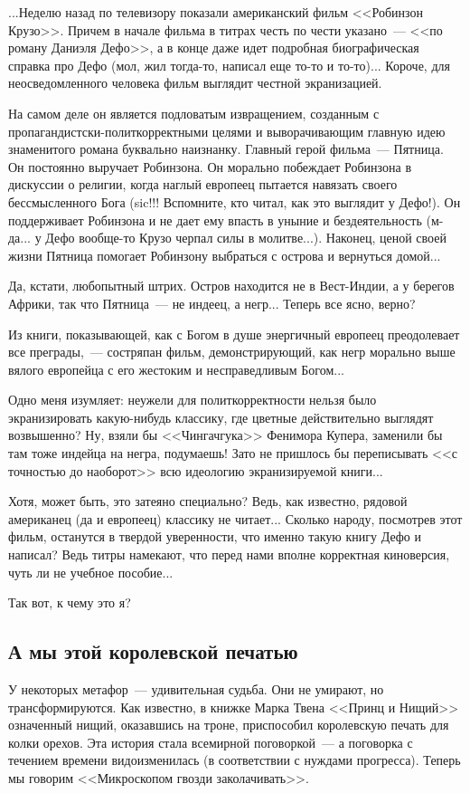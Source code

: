\documentclass{scrbook}
\newcommand{\flqq}{<<}
\newcommand{\frqq}{>>}
\newcommand{\mdash}{~--- }
\newcommand{\commamdash}{~--- } %
\newcommand{\essaysection}[1]{\subsection*{#1}\nopagebreak}
\begin{document}
...Неделю назад по телевизору показали американский фильм {\flqq}Робинзон Крузо{\frqq}. Причем в начале фильма в титрах честь по чести указано{\mdash}{\flqq}по роману Даниэля Дефо{\frqq}, а в конце даже идет подробная биографическая справка про Дефо (мол, жил тогда-то, написал еще то-то и то-то)... Короче, для неосведомленного человека фильм выглядит честной экранизацией.

На самом деле он является подловатым извращением, созданным с пропагандистски-политкорректными целями и выворачивающим главную идею знаменитого романа буквально наизнанку. Главный герой фильма{\mdash}Пятница. Он постоянно выручает Робинзона. Он морально побеждает Робинзона в дискуссии о религии, когда наглый европеец пытается навязать своего бессмысленного Бога (sic!!! Вспомните, кто читал, как это выглядит у Дефо!). Он поддерживает Робинзона и не дает ему впасть в уныние и бездеятельность (м-да... у Дефо вообще-то Крузо черпал силы в молитве...). Наконец, ценой своей жизни Пятница помогает Робинзону выбраться с острова и вернуться домой...

Да, кстати, любопытный штрих. Остров находится не в Вест-Индии, а у берегов Африки, так что Пятница{\mdash}не индеец, а негр... Теперь все ясно, верно?

Из книги, показывающей, как с Богом в душе энергичный европеец преодолевает все преграды,{\commamdash}состряпан фильм, демонстрирующий, как негр морально выше вялого европейца с его жестоким и несправедливым Богом...

Одно меня изумляет: неужели для политкорректности нельзя было экранизировать какую-нибудь классику, где цветные действительно выглядят возвышенно? Ну, взяли бы {\flqq}Чингачгука{\frqq} Фенимора Купера, заменили бы там тоже индейца на негра, подумаешь! Зато не пришлось бы переписывать {\flqq}с точностью до наоборот{\frqq} всю идеологию экранизируемой книги...

Хотя, может быть, это затеяно специально? Ведь, как известно, рядовой американец (да и европеец) классику не читает... Сколько народу, посмотрев этот фильм, останутся в твердой уверенности, что именно такую книгу Дефо и написал? Ведь титры намекают, что перед нами вполне корректная киноверсия, чуть ли не учебное пособие...

Так вот, к чему это я?

\essaysection{А мы этой королевской печатью}

У некоторых метафор{\mdash}удивительная судьба. Они не умирают, но трансформируются. Как известно, в книжке Марка Твена {\flqq}Принц и Нищий{\frqq} означенный нищий, оказавшись на троне, приспособил королевскую печать для колки орехов. Эта история стала всемирной поговоркой{\mdash}а поговорка с течением времени видоизменилась (в соответствии с нуждами прогресса). Теперь мы говорим {\flqq}Микроскопом гвозди заколачивать{\frqq}.
\end{document}
